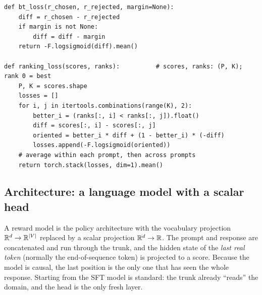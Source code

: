 \begin{lstlisting}[caption={Bradley--Terry and the grouped $K$-way ranking loss (\ident{llmsys/rlhf/losses.py}).},label={lst:rlhf:btloss}]
def bt_loss(r_chosen, r_rejected, margin=None):
    diff = r_chosen - r_rejected
    if margin is not None:
        diff = diff - margin
    return -F.logsigmoid(diff).mean()

def ranking_loss(scores, ranks):          # scores, ranks: (P, K); rank 0 = best
    P, K = scores.shape
    losses = []
    for i, j in itertools.combinations(range(K), 2):
        better_i = (ranks[:, i] < ranks[:, j]).float()
        diff = scores[:, i] - scores[:, j]
        oriented = better_i * diff + (1 - better_i) * (-diff)
        losses.append(-F.logsigmoid(oriented))
    # average within each prompt, then across prompts
    return torch.stack(losses, dim=1).mean()
\end{lstlisting}

\subsection{Architecture: a language model with a scalar head}

A reward model is the policy architecture with the vocabulary projection
$\mathbb{R}^{d}\to\mathbb{R}^{|V|}$ replaced by a scalar projection $\mathbb{R}^{d}\to\mathbb{R}$. The prompt and response are
concatenated and run through the trunk, and the hidden state of the \emph{last real token}
(normally the end-of-sequence token) is projected to a score. Because the model is causal, the
last position is the only one that has seen the whole response. Starting from the SFT model is
standard: the trunk already ``reads'' the domain, and the head is the only fresh layer.

